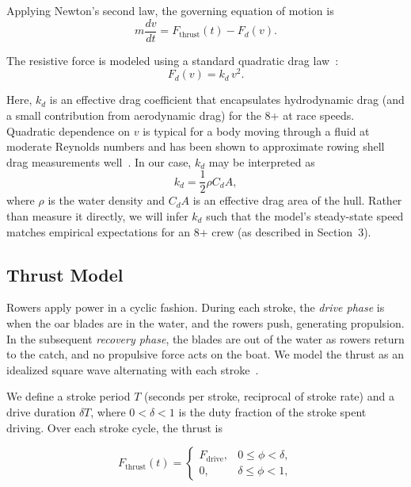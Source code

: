 \documentclass[12pt]{article}
\begin{document}
Applying Newton’s second law, the governing equation of motion is
\begin{equation}
    m \frac{dv}{dt} = F_{\text{thrust}}(t) - F_d(v). 
    \label{eq:eom}
\end{equation}

The resistive force is modeled using a standard quadratic drag law~\cite{pulman2007, dudhia2000}:
\begin{equation}
    F_d(v) = k_d\, v^2 .
    \label{eq:draglaw}
\end{equation}

Here, $k_d$ is an effective drag coefficient that encapsulates hydrodynamic drag (and a small contribution from aerodynamic drag) for the 8+ at race speeds. Quadratic dependence on $v$ is typical for a body moving through a fluid at moderate Reynolds numbers and has been shown to approximate rowing shell drag measurements well~\cite{buckmannharris2014, baudouinhawkins2002}. In our case, $k_d$ may be interpreted as
\[
    k_d = \frac{1}{2}\rho C_d A,
\]
where $\rho$ is the water density and $C_d A$ is an effective drag area of the hull. Rather than measure it directly, we will infer $k_d$ such that the model’s steady-state speed matches empirical expectations for an 8+ crew (as described in Section~3).

\newpage

\subsection{Thrust Model}

Rowers apply power in a cyclic fashion. During each stroke, the \emph{drive phase} is when the oar blades are in the water, and the rowers push, generating propulsion. In the subsequent \emph{recovery phase}, the blades are out of the water as rowers return to the catch, and no propulsive force acts on the boat. We model the thrust as an idealized square wave alternating with each stroke~\cite{lazauskas1997, brearleydemestre1996}. 

We define a stroke period $T$ (seconds per stroke, reciprocal of stroke rate) and a drive duration $\delta T$, where $0 < \delta < 1$ is the duty fraction of the stroke spent driving. Over each stroke cycle, the thrust is

\begin{equation}
F_{\text{thrust}}(t) =
\begin{cases}
F_{\text{drive}}, & 0 \le \phi < \delta, \\[6pt]
0, & \delta \le \phi < 1, 
\end{cases}
\label{eq:thrust}
\end{equation}
\end{document}
